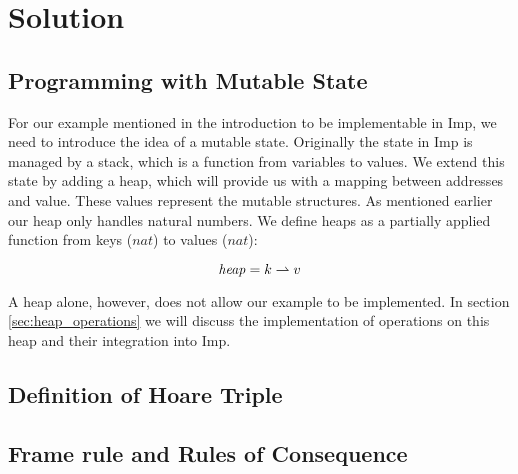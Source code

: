 \section{Solution}
\subsection{Programming with Mutable State}
\label{sec:programming_with_mutable_state}
For our example mentioned in the introduction to be implementable in Imp, we need to introduce the idea of a mutable state. Originally the state in Imp is managed by a stack, which is a function from variables to values. We extend this state by adding a heap, which will provide us with a mapping between addresses and value. These values represent the mutable structures. As mentioned earlier our heap only handles natural numbers. We define heaps as a partially applied function from keys ($nat$) to values ($nat$):

\[
\mathit{heap} = k\rightharpoonup v
\] 

A heap alone, however, does not allow our example to be implemented. In section \ref{sec:heap_operations} we will discuss the implementation of operations on this heap and their integration into Imp.



\subsection{Definition of Hoare Triple}


\subsection{Frame rule and Rules of Consequence}


